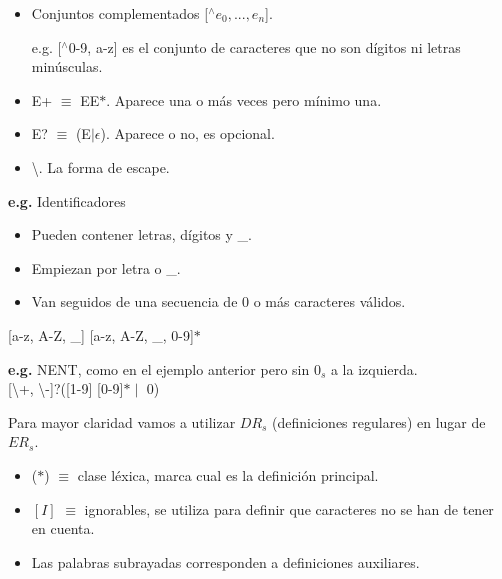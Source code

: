 \documentclass[\main/Apuntes_PL.tex]{subfiles}
\begin{document}
\begin{itemize}
\begin{itemize}
\begin{itemize}
                        \item Conjuntos complementados [$^\wedge e_0, ..., e_n$].
                              \par \noindent
                              e.g. [$^\wedge$0-9, a-z] es el conjunto de caracteres que no son dígitos ni letras minúsculas.
                        \item E+ $\equiv$ EE$\ast$. Aparece una o más veces pero mínimo una.
                        \item E? $\equiv$ (E$\mid\epsilon$). Aparece o no, es opcional.
                        \item \textbackslash. La forma de escape.
                      \end{itemize}
              \end{itemize}
      \end{itemize}

      \bigskip
      \par \noindent
      \textbf{e.g.} Identificadores
      \begin{itemize}
      \item Pueden contener letras, dígitos y \_.
      \item Empiezan por letra o \_.
      \item Van seguidos de una secuencia de 0 o más caracteres válidos.
      \end{itemize}
      \hspace{5mm}[a-z, A-Z, \_] [a-z, A-Z, \_, 0-9]$\ast$

      \bigskip
      \par \noindent
      \textbf{e.g.} NENT, como en el ejemplo anterior pero sin $0_s$ a la izquierda.\\
      \hspace{5mm} [\textbackslash+, \textbackslash -]?([1-9] [0-9]$\ast \mid$ 0)

      \newpage
      \par \noindent
      Para mayor claridad vamos a utilizar $DR_s$ (definiciones regulares) en lugar de $ER_s$.
      \begin{itemize}
        \item ($\ast$) $\equiv$ clase léxica, marca cual es la definición principal.
        \item $[I]$ $\equiv$ ignorables, se utiliza para definir que caracteres no se han de tener en cuenta.
        \item Las palabras subrayadas corresponden a definiciones auxiliares.
      \end{itemize}
\end{document}
